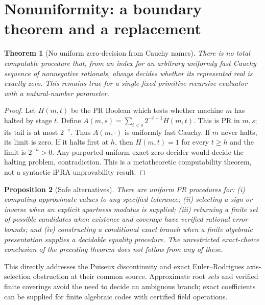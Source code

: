 \documentclass[11pt]{article}
\newtheorem{theorem}{Theorem}[section]
\newtheorem{proposition}[theorem]{Proposition}
\begin{document}
\section{Nonuniformity: a boundary theorem and a replacement}
\begin{theorem}[No uniform zero-decision from Cauchy names]
There is no total computable procedure that, from an index for an arbitrary uniformly fast Cauchy sequence of nonnegative rationals, always decides whether its represented real is exactly zero. This remains true for a single fixed primitive-recursive evaluator with a natural-number parameter.
\end{theorem}
\begin{proof}
Let $H(m,t)$ be the PR Boolean which tests whether machine $m$ has halted by stage $t$. Define $A(m,s)=\sum_{t<s}2^{-t-1}H(m,t)$. This is PR in $m,s$; its tail is at most $2^{-s}$. Thus $A(m,\cdot)$ is uniformly fast Cauchy. If $m$ never halts, its limit is zero. If it halts first at $h$, then $H(m,t)=1$ for every $t\ge h$ and the limit is $2^{-h}>0$. Any purported uniform exact-zero decider would decide the halting problem, contradiction. This is a metatheoretic computability theorem, not a syntactic iPRA unprovability result.\end{proof}
\begin{proposition}[Safe alternatives]
There are uniform PR procedures for: (i) computing approximate values to any specified tolerance; (ii) selecting a sign or inverse when an explicit apartness modulus is supplied; (iii) returning a \emph{finite set} of possible candidates when existence and coverage have verified rational error bounds; and (iv) constructing a conditional exact branch when a finite algebraic presentation supplies a decidable equality procedure. The unrestricted exact-choice conclusion of the preceding theorem does not follow from any of these.
\end{proposition}
This directly addresses the Puiseux discontinuity and exact Euler--Rodrigues axis-selection obstruction at their common source. Approximate root \emph{sets} and verified finite coverings avoid the need to decide an ambiguous branch; exact coefficients can be supplied for finite algebraic codes with certified field operations.
\end{document}
